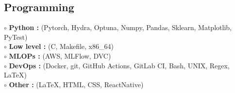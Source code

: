 \subsection{Programming}


	$ \circ $ \textbf{Python :}  (Pytorch, Hydra, Optuna, Numpy, Pandas, Sklearn, Matplotlib, PyTest) \\
	$ \circ $ \textbf{Low level :}  (C, Makefile, x86\_64)  \\
	$ \circ $ \textbf{MLOPs :}  (AWS, MLFlow, DVC) \\
	$ \circ $ \textbf{DevOps :}  (Docker, git, GitHub Actions, GitLab CI, Bash, UNIX, Regex, LaTeX) \\
	$ \circ $ \textbf{Other :}  (LaTeX, HTML, CSS, ReactNative) \\


\sectionspace %
